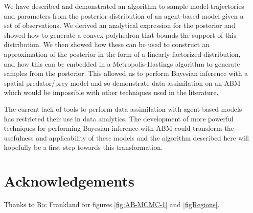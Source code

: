 \documentclass{article}
\begin{document}
We have described and demonstrated an algorithm to sample model-trajectories and parameters from the posterior distribution of an agent-based model given a set of observations. We derived an analytical expression for the posterior and showed how to generate a convex polyhedron that bounds the support of this distribution. We then showed how these can be used to construct an approximation of the posterior in the form of a linearly factorized distribution, and how this can be embedded in a Metropolis-Hastings algorithm to generate samples from the posterior. This allowed us to perform Bayesian inference with a spatial predator/prey model and so demonstrate data assimilation on an ABM which would be impossible with other techniques used in the literature.

The current lack of tools to perform data assimilation with agent-based models has restricted their use in data analytics. The development of more powerful techniques for performing Bayesian inference with ABM could transform the usefulness and applicability of these models and the algorithm described here will hopefully be a first step towards this transformation.

\section*{Acknowledgements}

Thanks to Ric Frankland for figures \ref{fig:AB-MCMC-1} and \ref{figRegions}.
\end{document}

